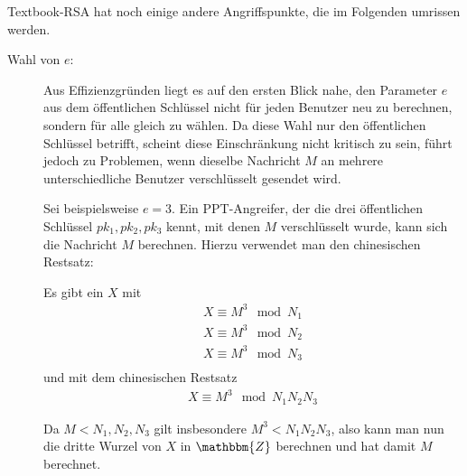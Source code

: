 Textbook-RSA hat noch einige andere
Angriffspunkte, die im Folgenden umrissen werden. 

\begin{description}
\item[Wahl von $e$:] Aus Effizienzgründen liegt es auf den ersten Blick
  nahe, den Parameter $e$ aus dem öffentlichen Schlüssel nicht für jeden
  Benutzer neu zu berechnen, sondern für alle gleich zu wählen. Da diese
  Wahl nur den öffentlichen Schlüssel betrifft, scheint diese
  Einschränkung nicht kritisch zu sein, führt jedoch zu Problemen, wenn
  dieselbe Nachricht $M$ an mehrere unterschiedliche Benutzer
  verschlüsselt gesendet wird. 
  
  Sei beispielsweise $e=3$. Ein PPT-Angreifer, der die drei öffentlichen
  Schlüssel $pk_1, pk_2, pk_3$ kennt, mit denen $M$ verschlüsselt wurde,
  kann sich die Nachricht $M$ berechnen. Hierzu verwendet man den
  chinesischen Restsatz:

  Es gibt ein $X$ mit
  \begin{align*}
    X \equiv M^3 \mod N_1\\
    X \equiv M^3 \mod N_2\\
    X \equiv M^3 \mod N_3\\
  \end{align*}
  und mit dem chinesischen Restsatz
  \begin{align*}
    X \equiv M^3 \mod N_1N_2N_3
  \end{align*}

Da $M < N_1, N_2, N_3$ gilt insbesondere $M^3<N_1N_2N_3$, also kann man nun die dritte Wurzel von $X$ in $\mathbbm{Z}$
berechnen und hat damit $M$ berechnet.
    

\end{description}
